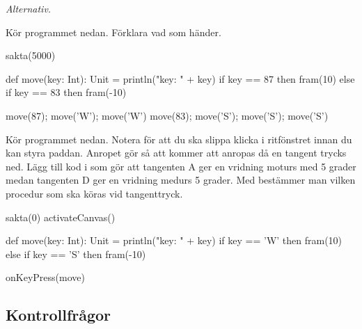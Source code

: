 









\Task \emph{Alternativ.} \label{kojo:alt}

\Subtask Kör programmet nedan. Förklara vad som händer. %

\begin{Code}
sakta(5000)

def move(key: Int): Unit =
  println("key: " + key)
  if key == 87 then fram(10)
  else if key == 83 then fram(-10)

move(87); move('W'); move('W')
move(83); move('S'); move('S'); move('S')
\end{Code}

\Subtask \label{subtask:keypress}  Kör programmet nedan. Notera  för att du ska slippa klicka i ritfönstret innan du kan styra paddan. Anropet  gör så att  kommer att anropas då en tangent trycks ned. Lägg till kod i  som gör att tangenten A ger en vridning moturs med 5 grader medan tangenten D ger en vridning medurs 5 grader. Med  bestämmer man vilken procedur som ska köras vid tangenttryck.

\begin{Code}
sakta(0)
activateCanvas()

def move(key: Int): Unit =
  println("key: " + key)
  if key == 'W' then fram(10)
  else if key == 'S' then fram(-10)

onKeyPress(move)
\end{Code}





\subsection{Kontrollfrågor}\Checkpoint

